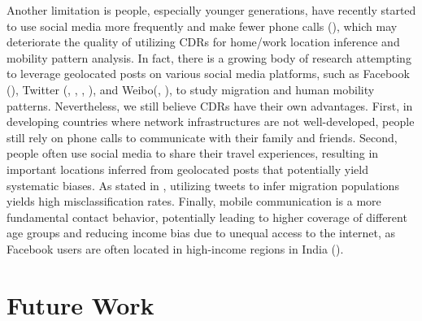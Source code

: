 Another limitation is people, especially younger generations, have recently started to use social media more frequently and make fewer phone calls (\cite{garrett2023linking}), which may deteriorate the quality of utilizing CDRs for home/work location inference and mobility pattern analysis.
In fact, there is a growing body of research attempting to leverage geolocated posts on various social media platforms, such as Facebook (\cite{sahai2022social}), Twitter (\cite{zagheni2014inferring}, \cite{hawelka2014geo}, \cite{jurdak2015understanding}, \cite{luo2016explore}), and Weibo(\cite{cui2018social}, \cite{ebrahimpour2020analyzing}), to study migration and human mobility patterns.
Nevertheless, we still believe CDRs have their own advantages.
First, in developing countries where network infrastructures are not well-developed, people still rely on phone calls to communicate with their family and friends.
Second, people often use social media to share their travel experiences, resulting in important locations inferred from geolocated posts that potentially yield systematic biases. As stated in \cite{armstrong2021challenges}, utilizing tweets to infer migration populations yields high misclassification rates.
Finally, mobile communication is a more fundamental contact behavior, potentially leading to higher coverage of different age groups and reducing income bias due to unequal access to the internet, as Facebook users are often located in high-income regions in India (\cite{sahai2022social}).

\section{Future Work}
